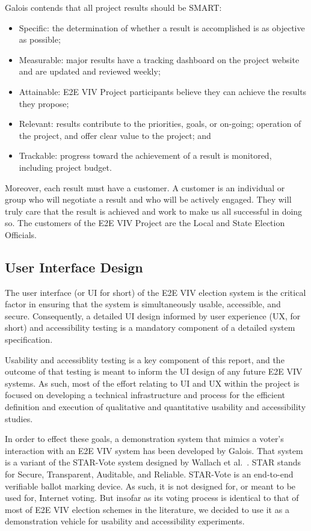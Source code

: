 Galois contends that all project results should be SMART:
\begin{itemize}
\item Specific: the determination of whether a result is accomplished
  is as objective as possible;
\item Measurable: major results have a tracking dashboard on the
  project website and are updated and reviewed weekly;
\item Attainable: E2E VIV Project participants believe they can
  achieve the results they propose;
\item Relevant: results contribute to the priorities, goals, or
  on-going; operation of the project, and offer clear value to the
  project; and
\item Trackable: progress toward the achievement of a result is
  monitored, including project budget.
\end{itemize}

Moreover, each result must have a customer. A customer is an
individual or group who will negotiate a result and who will be
actively engaged. They will truly care that the result is achieved and
work to make us all successful in doing so. The customers of the E2E
VIV Project are the Local and State Election Officials.

\subsection{User Interface Design}
\label{sec:user-interf-design}

The user interface (or UI for short) of the E2E VIV election system is
the critical factor in ensuring that the system is simultaneously
usable, accessible, and secure. Consequently, a detailed UI design
informed by user experience (UX, for short) and accessibility testing
is a mandatory component of a detailed system specification.

Usability and accessiblity testing is a key component of this report,
and the outcome of that testing is meant to inform the UI design of
any future E2E VIV systems. As such, most of the effort relating to
UI and UX within the project is focused on developing a technical
infrastructure and process for the efficient definition and execution
of qualitative and quantitative usability and accessibility studies.

In order to effect these goals, a demonstration system that mimics a
voter's interaction with an E2E VIV system has been developed by
Galois. That system is a variant of the STAR-Vote system designed by
Wallach et al.~\cite{star-vote}. STAR stands for Secure, Transparent,
Auditable, and Reliable. STAR-Vote is an end-to-end verifiable ballot
marking device. As such, it is not designed for, or meant to be used
for, Internet voting. But insofar as its voting process is identical
to that of most of E2E VIV election schemes in the literature, we
decided to use it as a demonstration vehicle for usability and
accessibility experiments.

